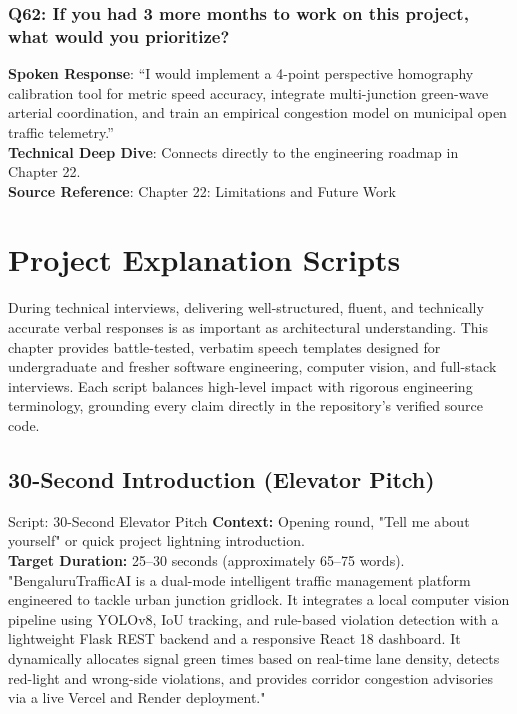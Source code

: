 \documentclass[11pt,a4paper,oneside]{report}
\begin{document}
\subsection*{Q62: If you had 3 more months to work on this project, what would you prioritize?}
\begin{interviewbox}
\textbf{Spoken Response}: ``I would implement a 4-point perspective homography calibration tool for metric speed accuracy, integrate multi-junction green-wave arterial coordination, and train an empirical congestion model on municipal open traffic telemetry.''\\
\textbf{Technical Deep Dive}: Connects directly to the engineering roadmap in Chapter 22.\\
\textbf{Source Reference}: Chapter 22: Limitations and Future Work
\end{interviewbox}



\chapter{Project Explanation Scripts}
\label{ch:explanation_scripts}

During technical interviews, delivering well-structured, fluent, and technically accurate verbal responses is as important as architectural understanding. This chapter provides battle-tested, verbatim speech templates designed for undergraduate and fresher software engineering, computer vision, and full-stack interviews. Each script balances high-level impact with rigorous engineering terminology, grounding every claim directly in the repository's verified source code.

\section{30-Second Introduction (Elevator Pitch)}
\label{sec:script_30s}

\begin{interviewq}{Script: 30-Second Elevator Pitch}
\textbf{Context:} Opening round, "Tell me about yourself" or quick project lightning introduction.\\
\textbf{Target Duration:} 25--30 seconds (approximately 65--75 words).
\tcblower
"BengaluruTrafficAI is a dual-mode intelligent traffic management platform engineered to tackle urban junction gridlock. It integrates a local computer vision pipeline using YOLOv8, IoU tracking, and rule-based violation detection with a lightweight Flask REST backend and a responsive React 18 dashboard. It dynamically allocates signal green times based on real-time lane density, detects red-light and wrong-side violations, and provides corridor congestion advisories via a live Vercel and Render deployment."
\end{interviewq}
\end{document}
